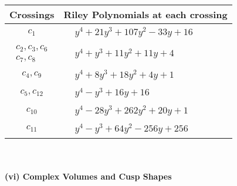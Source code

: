 \documentclass[1p]{elsarticle_modified}
\theoremstyle{definition}
\begin{document}
\begin{tabular}{m{50pt}|m{274pt}}
Crossings & \hspace{64pt}Riley Polynomials at each crossing \\
\hline $$\begin{aligned}c_{1}\end{aligned}$$&$\begin{aligned}
&y^4+21 y^3+107 y^2-33 y+16
\end{aligned}$\\
\hline $$\begin{aligned}c_{2},c_{3},c_{6}\\c_{7},c_{8}\end{aligned}$$&$\begin{aligned}
&y^4+y^3+11 y^2+11 y+4
\end{aligned}$\\
\hline $$\begin{aligned}c_{4},c_{9}\end{aligned}$$&$\begin{aligned}
&y^4+8 y^3+18 y^2+4 y+1
\end{aligned}$\\
\hline $$\begin{aligned}c_{5},c_{12}\end{aligned}$$&$\begin{aligned}
&y^4- y^3+16 y+16
\end{aligned}$\\
\hline $$\begin{aligned}c_{10}\end{aligned}$$&$\begin{aligned}
&y^4-28 y^3+262 y^2+20 y+1
\end{aligned}$\\
\hline $$\begin{aligned}c_{11}\end{aligned}$$&$\begin{aligned}
&y^4- y^3+64 y^2-256 y+256
\end{aligned}$\\
\hline
\end{tabular}\\~\\
\newpage\flushleft \textbf{(vi) Complex Volumes and Cusp Shapes}
\end{document}
